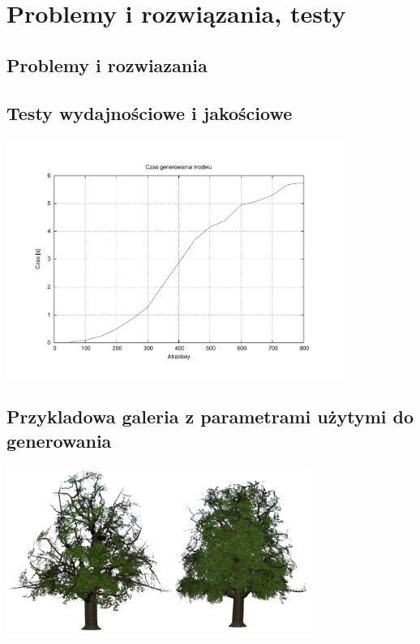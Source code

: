 
\chapter{Problemy i rozwiązania, testy}

\section{Problemy i rozwiazania}

\section{Testy wydajnościowe i jakościowe}

\begin{center}
	\includegraphics[width=110mm]{images/performance.pdf}
\end{center}


\section{Przykladowa galeria z parametrami użytymi do generowania}

\begin{center}
	\includegraphics[width=100mm]{images/renders/greentree.png}
\end{center}

